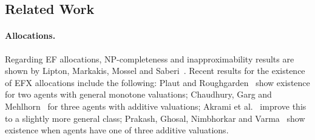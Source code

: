 





\subsection{Related Work}

\paragraph{Allocations.} Regarding EF allocations, NP-completeness and inapproximability results are shown by Lipton, Markakis, Mossel and Saberi~\cite{LiptonEtAl}.
Recent results for the existence of EFX allocations include the following: Plaut and Roughgarden~\cite{PlautRough} show existence for two agents with general monotone valuations; Chaudhury, Garg and Mehlhorn~\cite{CGM24} for three agents with additive valuations; Akrami et al.~\cite{akrami2022efxallocationssimplificationsimprovements} improve this to a slightly more general class; Prakash, Ghosal, Nimbhorkar and Varma~\cite{efxexistsfor3typesofadditiveagents} show existence when agents have one of three additive valuations.



